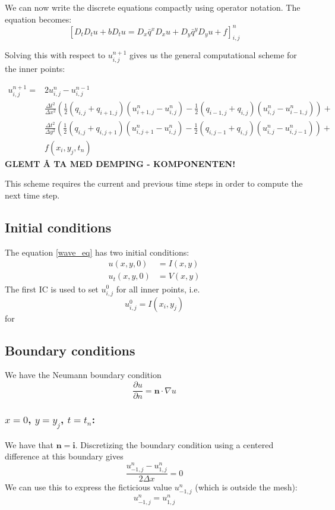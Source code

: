 \documentclass[11pt]{article} %
\newcommand{\dun}{\frac{\partial u}{\partial n}}
\newcommand{\bn}{\mathbf{n}}
\newcommand{\bi}{\mathbf{i}}
\newcommand{\Dx}{\Delta x}
\newcommand{\Dy}{\Delta y}
\newcommand{\Dt}{\Delta t}
\newcommand{\unp}{u^{n+1}}
\newcommand{\un}{u^{n}}
\newcommand{\unm}{u^{n-1}}
\newcommand{\half}{\frac{1}{2}}
\begin{document}
We can now write the discrete equations compactly using operator notation. The equation becomes:
\begin{equation}
\left[D_tD_tu + bD_tu = D_x\bar{q}^xD_xu + D_y\bar{q}^yD_yu + f\right]^n_{i,j}
\end{equation}

Solving this with respect to $\unp_{i,j}$ gives us the general computational scheme for the inner points:

\begin{align}
\unp_{i,j} = &2\un_{i,j} - \unm_{i,j} \\
&\frac{\Dt^2}{\Dx^2}\left(\half(q_{i,j} + q_{i+1,j})(\un_{i+1,j}-\un_{i,j}) - \half(q_{i-1,j} + q_{i,j})(\un_{i,j}-\un_{i-1,j})\right) + \\
&\frac{\Dt^2}{\Dy^2}\left(\half(q_{i,j} + q_{i,j+1})(\un_{i,j+1}-\un_{i,j}) - \half(q_{i,j-1} + q_{i,j})(\un_{i,j}-\un_{i,j-1})\right) +\\
&f(x_i, y_j, t_n)
\end{align}
\textbf{GLEMT Å TA MED DEMPING - KOMPONENTEN!}

This scheme requires the current and previous time steps in order to compute the next time step. 

\subsection*{Initial conditions}
The equation \eqref{wave_eq} has two initial conditions:
\begin{align*}
u(x,y,0) &= I(x,y)\\
u_t(x,y,0) &= V(x,y)
\end{align*}
The first IC is used to set $u^0_{i,j}$ for all inner points, i.e.
\[u^0_{i,j} = I(x_i,y_j)\] for 


\subsection*{Boundary conditions}
We have the Neumann boundary condition
\begin{equation*}
\dun = \bn \cdot \nabla u
\end{equation*}

\subsubsection*{ $x=0$, $y = y_j$, $t = t_n$:}
 We have that $\bn = \bi$. Discretizing the boundary condition using a centered difference at this boundary gives
\begin{equation*}
\frac{u^n_{-1,j} - u^n_{1,j}}{2\Dx} = 0
\end{equation*}
We can use this to express the ficticious value $u^n_{-1,j}$ (which is outside the mesh):
\begin{equation}
u^n_{-1,j} = u^n_{1,j}
\label{bc_x0}
\end{equation}
\end{document}
